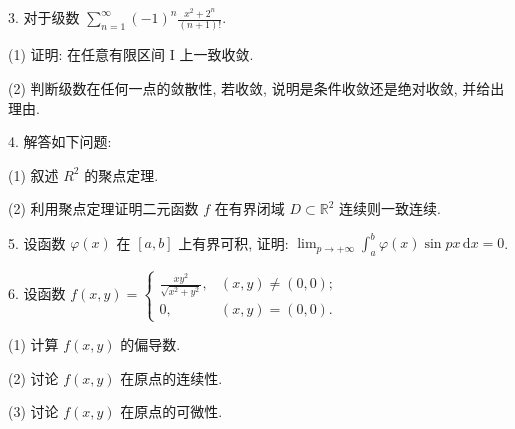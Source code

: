 \documentclass{examcollection}
\begin{document}
{\begin{minipage}{\textwidth}
3. 对于级数 $\sum_{n=1}^{\infty} (-1)^{n} \frac{x^{2} + 2^{n}}{(n+1)!}$.\par
(1) 证明: 在任意有限区间 I 上一致收敛.\par
(2) 判断级数在任何一点的敛散性, 若收敛, 说明是条件收敛还是绝对收敛, 并给出理由.\par
4. 解答如下问题:\par
(1) 叙述  $R^{2}$  的聚点定理.\par
(2) 利用聚点定理证明二元函数 $f$ 在有界闭域 $D \subset \mathbb{R}^2$ 连续则一致连续.\par
5. 设函数 $\varphi(x)$ 在 $[a, b]$ 上有界可积, 证明: $\lim_{p \to +\infty} \int_{a}^{b} \varphi(x) \sin px \, \mathrm{d}x = 0$.\par
6. 设函数 $f(x, y) = \begin{cases} \frac{xy^2}{\sqrt{x^2 + y^2}}, & (x, y) \neq (0, 0); \\ 0, & (x, y) = (0, 0). \end{cases}$\par
(1) 计算  $f(x,y)$  的偏导数.\par
(2) 讨论 $f(x, y)$ 在原点的连续性.\par
(3) 讨论 $f(x, y)$ 在原点的可微性.\par
\end{minipage}}
\ifdim\dimexpr\ht\proofbox+\dp\proofbox\relax>\textheight
\noindent\resizebox{!}{\textheight}{\usebox{\proofbox}}\else\noindent\usebox{\proofbox}\fi\clearpage
\end{document}
